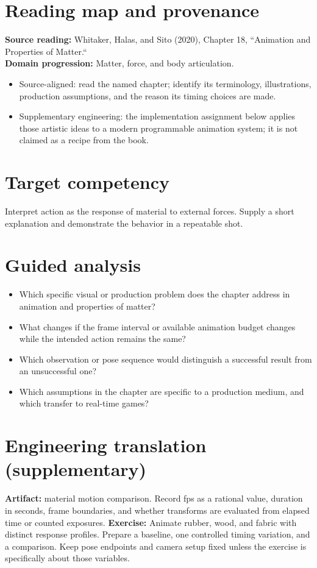 \documentclass[10pt,letterpaper]{article}
\begin{document}
\makedoctitle
\makedocsummary

\section{Reading map and provenance}
\textbf{Source reading:} Whitaker, Halas, and Sito (2020), Chapter 18, ``Animation and Properties of Matter.``\\
\textbf{Domain progression:} Matter, force, and body articulation.
\begin{itemize}
\item Source-aligned: read the named chapter; identify its terminology, illustrations, production assumptions, and the reason its timing choices are made.
\item Supplementary engineering: the implementation assignment below applies those artistic ideas to a modern programmable animation system; it is not claimed as a recipe from the book.
\end{itemize}
\section{Target competency}
Interpret action as the response of material to external forces. Supply a short explanation and demonstrate the behavior in a repeatable shot.
\section{Guided analysis}
\begin{itemize}
\item Which specific visual or production problem does the chapter address in animation and properties of matter?
\item What changes if the frame interval or available animation budget changes while the intended action remains the same?
\item Which observation or pose sequence would distinguish a successful result from an unsuccessful one?
\item Which assumptions in the chapter are specific to a production medium, and which transfer to real-time games?
\end{itemize}
\section{Engineering translation (supplementary)}
\textbf{Artifact:} material motion comparison. Record fps as a rational value, duration in seconds, frame boundaries, and whether transforms are evaluated from elapsed time or counted exposures.
\textbf{Exercise:} Animate rubber, wood, and fabric with distinct response profiles. Prepare a baseline, one controlled timing variation, and a comparison. Keep pose endpoints and camera setup fixed unless the exercise is specifically about those variables.
\end{document}
